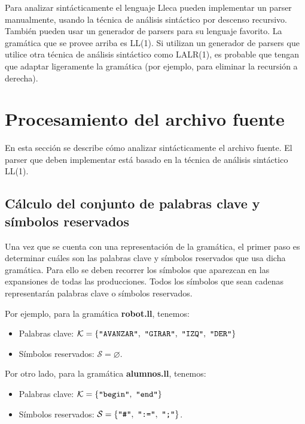 \documentclass{article}
\newcommand{\lleca}{\textsf{Lleca}\xspace}
\renewcommand{\emptyset}{\varnothing}
\begin{document}
Para analizar sint\'acticamente el lenguaje \lleca
pueden implementar un parser manualmente, usando la t\'ecnica de
an\'alisis sint\'actico por descenso recursivo.
Tambi\'en pueden usar un generador de parsers para su lenguaje favorito.
La gram\'atica que se provee arriba es LL(1).
Si utilizan un generador de parsers que utilice otra t\'ecnica de
an\'alisis sint\'actico como LALR(1),
es probable que tengan que adaptar ligeramente la gram\'atica
(por ejemplo, para eliminar la recursi\'on a derecha). 

\section{Procesamiento del archivo fuente}

En esta secci\'on se describe c\'omo analizar sint\'acticamente el archivo
fuente. El parser que deben implementar est\'a basado en la t\'ecnica de
an\'alisis sint\'actico LL(1).

\subsection{C\'alculo del conjunto de palabras clave y s\'imbolos reservados}

Una vez que se cuenta con una representaci\'on de la gram\'atica,
el primer paso es determinar cu\'ales son las palabras clave y
s\'imbolos reservados que usa dicha gram\'atica.
Para ello se deben recorrer los s\'imbolos que aparezcan en
las expansiones de todas las producciones.
Todos los s\'imbolos que sean cadenas representar\'an palabras clave o
s\'imbolos reservados.
\medskip

Por ejemplo, para la gram\'atica {\bf robot.ll}, tenemos:
\begin{itemize}
\item Palabras clave: $\mathcal{K} = \{\verb|"AVANZAR"|,\ \verb|"GIRAR"|,\ \verb|"IZQ"|,\ \verb|"DER"|\}$
\item S\'imbolos reservados: $\mathcal{S} = \emptyset$.
\end{itemize}
\medskip

Por otro lado, para la gram\'atica {\bf alumnos.ll}, tenemos:
\begin{itemize}
\item Palabras clave: $\mathcal{K} = \{\verb|"begin"|,\ \verb|"end"|\}$
\item S\'imbolos reservados: $\mathcal{S} = \{\verb|"#"|,\ \verb|":="|,\ \verb|";"|\}$.
\end{itemize}
\medskip
\end{document}
